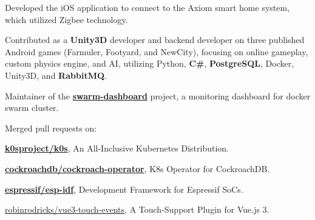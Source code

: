 \documentclass[letterpaper]{deedy-resume} %
\begin{document}
\begin{minipage}[t]{0.66\textwidth}
\begin{tightitemize}
\end{tightitemize}

\sectionspace %



\begin{tightitemize}
\item Developed the iOS application to connect to the Axiom smart home system, which utilized Zigbee technology.
\end{tightitemize}

\sectionspace %



\begin{tightitemize}
\item Contributed as a {\bf Unity3D} developer and backend developer on three published Android games (Farmuler, Footyard, and NewCity), focusing on online gameplay, custom physics engine, and AI, utilizing Python, {\bf C\#}, {\bf PostgreSQL}, Docker, Unity3D, and {\bf RabbitMQ}.
\end{tightitemize}

\sectionspace %



\descript{}
\nolocation
\begin{tightitemize}
\item Maintainer of the \href{https://github.com/mohsenasm/swarm-dashboard}{\bf swarm-dashboard} project, a monitoring dashboard for docker swarm cluster.
\item Merged pull requests on:
\vspace{0.2cm}
\begin{tightitemize}
\item \href{https://github.com/k0sproject/k0s}{\bf k0sproject/k0s}{\footnotesize , An All-Inclusive Kubernetes Distribution.}
\item \href{https://github.com/cockroachdb/cockroach-operator}{\bf cockroachdb/cockroach-operator}{\footnotesize , K8s Operator for CockroachDB.}
\item \href{https://github.com/espressif/esp-idf}{\bf espressif/esp-idf}{\footnotesize , Development Framework for Espressif SoCs.}
\item \href{https://github.com/robinrodricks/vue3-touch-events}{robinrodricks/vue3-touch-events}{\footnotesize , A Touch-Support Plugin for Vue.js 3.}
\end{tightitemize}
\end{tightitemize}


\end{minipage}
\end{document}
